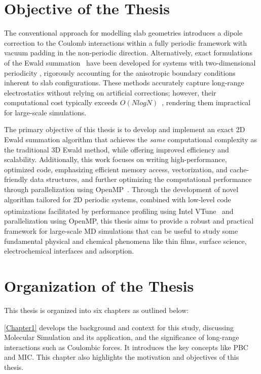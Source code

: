 \section{Objective of the Thesis}
The conventional approach for modelling slab geometries introduces a dipole correction \cite{dipole-yeh-berkowitz} to the Coulomb interactions within a fully periodic framework with vacuum padding in the non-periodic direction. Alternatively, exact formulations of the Ewald summation~\cite{Ewald1921} have been developed for systems with two-dimensional periodicity \cite{kawata, PARRY1975433,de1979electrostatic, Heyes19771485}, rigorously accounting for the anisotropic boundary conditions inherent to slab configurations. These methods accurately capture long-range electrostatics without relying on artificial corrections; however, their computational cost typically exceeds $O(NlogN)$~\cite{huang2024pmc}, rendering them impractical for large-scale simulations.

The primary objective of this thesis is to develop and implement an exact 2D Ewald summation algorithm that achieves the \emph{same} computational complexity as the traditional 3D Ewald method, while offering improved efficiency and scalability. Additionally, this work focuses on writing high-performance, optimized code, emphasizing efficient memory access, vectorization, and cache-friendly data structures, and further optimizing the computational performance through parallelization using OpenMP~\cite{dagum1998openmp}. Through the development of novel algorithm tailored for 2D periodic systems, combined with low-level code optimizations facilitated by performance profiling using Intel\textsuperscript{\textregistered} VTune~\cite{VTUNE} and parallelization using OpenMP, this thesis aims to provide a robust and practical framework for large-scale \acs{MD} simulations that can be useful to study some fundamental physical and chemical phenomena like thin films, surface science,  electrochemical interfaces and adsorption.

\section{Organization of the Thesis}
This thesis is organized into six chapters as outlined below:

\autoref{Chapter1} develops the background and context for this study, discussing Molecular Simulation and its application, and the significance of long-range interactions such as Coulombic forces. It introduces the key concepts like \ac{PBC} and \ac{MIC}. This chapter also highlights the motivation and objectives of this thesis.

